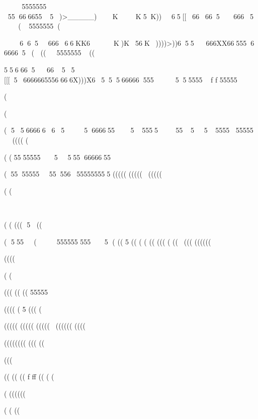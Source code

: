 5555555
556666555)>_____)KK5K))65[[666656665
(5555555(


66566666KK6K)K56K))))>))655666XX66555666665( ((
  5555555((




5566656655
[[[56666665556666X)))X655566666555555555  f  f 55555  

(


 
(

(
55666666556666555555555555555 55555     ((((
(             



( (555555555556666655

(555555555556555555555   ((((( ((((((((((







(
      (





( (
((( 5  ((


( 555
( 555555 5555  (
((  5     ((
(
(  (( ((( (   (((((
((((((








((((

(  (




(((    ((   ((  55555 








(((( (  5   (((            (









(((((     (((((  (((((((((((
((((

((((((((
(((           (( 



(((

(( ((            (( f ff            ((  (   ( 


(
((((((


(
(
((







